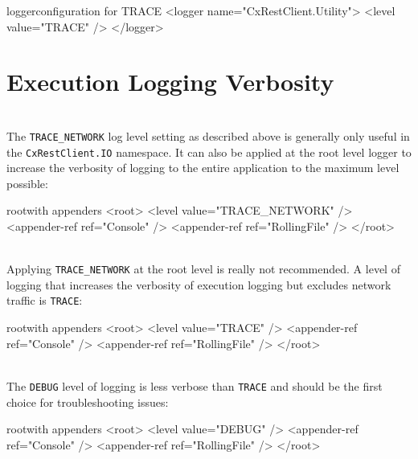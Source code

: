 \begin{xml}{logger}{configuration for TRACE}{}
<logger name="CxRestClient.Utility">
  <level value="TRACE" />
</logger>
\end{xml}

\section{Execution Logging Verbosity}

\noindent\\The \texttt{TRACE\_NETWORK} log level setting as described above is generally only useful in the 
\texttt{CxRestClient.IO} namespace.  It can also be applied at the root level logger to increase the
verbosity of logging to the entire application to the maximum level possible:

\begin{xml}{root}{with appenders}{}
<root>
    <level value="TRACE_NETWORK" />
    <appender-ref ref="Console" />
    <appender-ref ref="RollingFile" />
</root>
\end{xml}

\noindent\\Applying \texttt{TRACE\_NETWORK} at the root level is really not recommended.  A level of logging that increases the verbosity of execution
logging but excludes network traffic is \texttt{TRACE}:

\begin{xml}{root}{with appenders}{}
<root>
    <level value="TRACE" />
    <appender-ref ref="Console" />
    <appender-ref ref="RollingFile" />
</root>
\end{xml}

\noindent\\The \texttt{DEBUG} level of logging is less verbose than \texttt{TRACE} and should be the first choice for troubleshooting issues:

\begin{xml}{root}{with appenders}{}
<root>
    <level value="DEBUG" />
    <appender-ref ref="Console" />
    <appender-ref ref="RollingFile" />
</root>
\end{xml}
